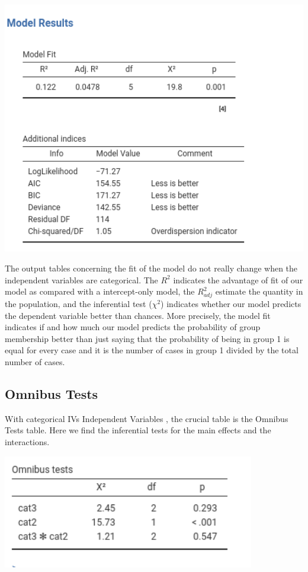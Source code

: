 \documentclass[
]{book}
\begin{document}
\includegraphics[width=6.24in]{bookletpics/3_logistic_output7}

The output tables concerning the fit of the model do not really change when the independent variables are categorical. The \(R^2\) indicates the advantage of fit of our model as compared with a intercept-only model, the \(R^2_{adj}\) estimate the quantity in the population, and the inferential test (\(\chi^2\)) indicates whether our model predicts the dependent variable better than chances. More precisely, the model fit indicates if and how much our model predicts the probability of group membership better than just saying that the probability of being in group 1 is equal for every case and it is the number of cases in group 1 divided by the total number of cases.

\hypertarget{omnibus-tests-2}{%
\subsection{Omnibus Tests}\label{omnibus-tests-2}}

With categorical {IVs {Independent Variables} }, the crucial table is the {Omnibus Tests} table. Here we find the inferential tests for the main effects and the interactions.

\includegraphics[width=4.33in]{bookletpics/3_logistic_output8}
\end{document}
